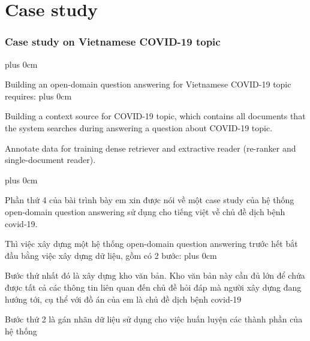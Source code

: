 \documentclass[11pt]{beamer}
\renewcommand{\raggedright}{\leftskip=0pt \rightskip=0pt plus 0cm}
\let\olditemize=\itemize
\renewenvironment{itemize}{\olditemize\raggedright}{\endlist}
\begin{document}
\section{Case study}
\begin{frame}
	\frametitle{Case study on Vietnamese COVID-19 topic}
	\begin{itemize}
		\item Building an open-domain question answering for Vietnamese COVID-19 topic requires:
		\begin{itemize}
			\item Building a context source for COVID-19 topic, which contains all documents that the system searches during answering a question about COVID-19 topic.
			\item Annotate data for training dense retriever and extractive reader (re-ranker and single-document reader).
		\end{itemize}
	\end{itemize}
\end{frame}
\begin{frame}
\begin{itemize}
	\item Phần thứ 4 của bài trình bày em xin được nói về một case study của hệ thống open-domain question answering sử dụng cho tiếng việt về chủ đề dịch bệnh covid-19.
	\item Thì việc xây dựng một hệ thống open-domain question answering trước hết bắt đầu bằng việc xây dựng dữ liệu, gồm có 2 bước:
	\begin{itemize}
		\item Bước thứ nhất đó là xây dựng kho văn bản. Kho văn bản này cần đủ lớn để chứa được tất cả các thông tin liên quan đến chủ đề hỏi đáp mà người xây dựng đang hướng tới, cụ thể với đồ án của em là chủ đề dịch bệnh covid-19
		\item Bước thứ 2 là gán nhãn dữ liệu sử dụng cho việc huấn luyện các thành phần của hệ thống
	\end{itemize}
\end{itemize}
\end{frame}
\end{document}
